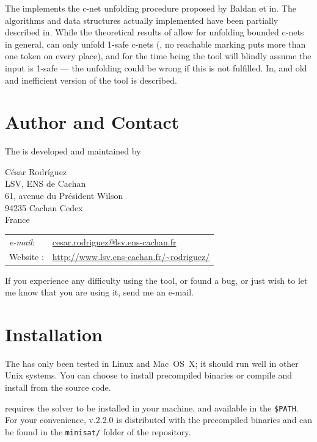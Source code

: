 \documentclass[a4paper]{refart}
\begin{document}
The \cunft{} implements the c-net unfolding procedure proposed by Baldan et
\al in\cite{BCKS08}.  The algorithms and data structures actually
implemented have been partially described in\cite{RSB11,BBCKRS12}.  While
the theoretical results of\cite{BCKS08,RSB11,BBCKRS12} allow for unfolding
bounded c-nets in general, \cunf can only unfold 1-safe c-nets (\ie, no
reachable marking puts more than one token on every place), and for the
time being the tool will blindly assume the input is 1-safe ---
the unfolding could be wrong if this is not fulfilled.
In\cite{Rod10}, and old and inefficient version of the tool is described.

\section{Author and Contact}%
\label{s:author}

The \cunft{} is developed and maintained by 

\medskip

César Rodríguez \\[1ex]
LSV, ENS de Cachan \\
61, avenue du Président Wilson \\
94235 Cachan Cedex \\
France

\begin{tabular}{ll}
\textit{e-mail}: & \url{cesar.rodriguez@lsv.ens-cachan.fr} \\
Website        : & \url{http://www.lsv.ens-cachan.fr/~rodriguez/}
\end{tabular}

\medskip

If you experience any difficulty using the tool, or found a bug,
or just wish to let me know that you are using it, send me an e-mail.

\section{Installation}%

The \cunft{} has only been tested in Linux and Mac~OS~X; it should
run well in other Unix systems.
You can choose to install precompiled binaries or compile and install from the
source code.

\cna requires the \minisat solver to be installed in your machine, and
available in the \verb!$PATH!.
For your convenience, \minisat v.2.2.0 is distributed with the precompiled
binaries and can be found in the \verb!minisat/! folder of the repository.
\end{document}
